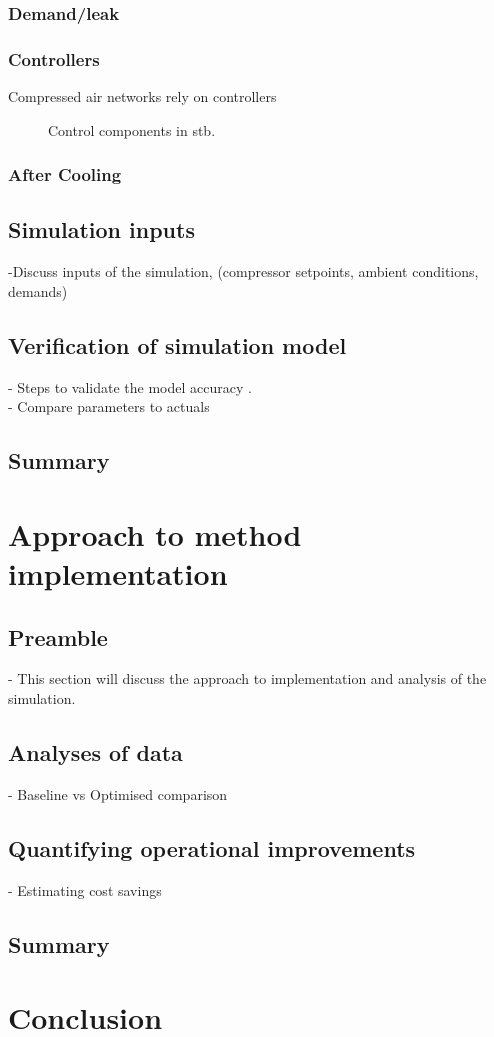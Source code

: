		\subsubsection{Demand/leak}
	
		\subsubsection{Controllers}
		Compressed air networks rely on controllers
\begin{figure}[h]
	\centering
	\caption{Control components in \gls{stb}.}
	\label{fig: Controller models}
\end{figure}
		\subsubsection{After Cooling}
	\subsection{Simulation inputs}
		-Discuss inputs of the simulation, (compressor setpoints, ambient conditions, demands)
	\subsection{Verification of simulation model}
		- Steps to validate  the model accuracy .\\
		- Compare parameters to actuals
	\subsection{Summary}
\section{Approach to method implementation}
	\subsection{Preamble}
		- This section will discuss the approach to implementation and analysis of the simulation.
	\subsection{Analyses of data}
		- Baseline vs Optimised comparison \\
	\subsection{Quantifying operational improvements}
		- Estimating cost savings
	\subsection{Summary}
\section{Conclusion}
